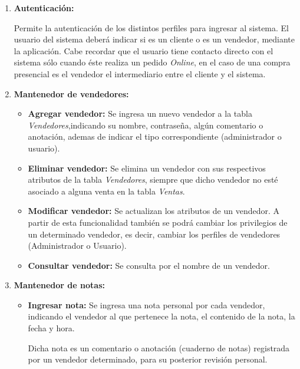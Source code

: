 \documentclass[letterpaper,12pt]{article}
\begin{document}
\begin{enumerate} 

\item \textbf{Autenticación: }

Permite la autenticación de los distintos perfiles para ingresar al sistema.
El usuario del sistema deberá indicar si es un cliente o es un vendedor, mediante la 
aplicación. Cabe recordar que el usuario tiene contacto directo con el sistema
sólo cuando éste realiza un pedido \emph{Online}, en el caso de una compra presencial es el 
vendedor el intermediario entre el cliente y el sistema.



\item \textbf{Mantenedor de vendedores:} 



\begin{itemize}
\item \textbf{Agregar vendedor:} 
Se ingresa un nuevo vendedor a la tabla \emph{Vendedores},indicando su nombre, contraseña, algún comentario o anotación, ademas de
indicar el tipo correspondiente (administrador o usuario).

\item \textbf{Eliminar vendedor:} 
Se elimina un vendedor con sus respectivos atributos de la tabla \emph{Vendedores}, siempre que dicho 
vendedor no esté asociado a alguna venta en la tabla \emph{Ventas}.

\item \textbf{Modificar vendedor:} 
Se actualizan los atributos de un vendedor. A partir de esta funcionalidad también se podrá cambiar 
los privilegios de un determinado vendedor, es decir, cambiar los perfiles de vendedores (Administrador o Usuario).

\item \textbf{Consultar vendedor:}
Se consulta por el nombre de un vendedor.
\end{itemize}

\newpage

\item \textbf{Mantenedor de notas:}

\begin{itemize}

\item \textbf{Ingresar nota:}
Se ingresa una nota personal por cada vendedor, indicando el vendedor al que pertenece la nota, el contenido de 
la nota, la fecha y hora.

Dicha nota es un comentario o anotación (cuaderno de notas) registrada por un vendedor determinado, para 
su posterior revisión personal.


\end{itemize}
\end{enumerate}
\end{document}
